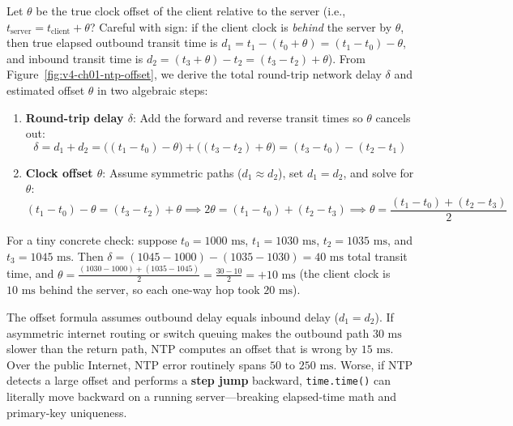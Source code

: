 Let $\theta$ be the true clock offset of the client relative to the server (i.e., $t_{\text{server}} = t_{\text{client}} + \theta$? Careful with sign: if the client clock is \emph{behind} the server by $\theta$, then true elapsed outbound transit time is $d_1 = t_1 - (t_0 + \theta) = (t_1 - t_0) - \theta$, and inbound transit time is $d_2 = (t_3 + \theta) - t_2 = (t_3 - t_2) + \theta$). From Figure~\ref{fig:v4-ch01-ntp-offset}, we derive the total round-trip network delay $\delta$ and estimated offset $\theta$ in two algebraic steps:
\begin{enumerate}[leftmargin=18pt]
  \item \textbf{Round-trip delay $\delta$}: Add the forward and reverse transit times so $\theta$ cancels out:
  \begin{equation}
  \delta = d_1 + d_2 = \bigl((t_1 - t_0) - \theta\bigr) + \bigl((t_3 - t_2) + \theta\bigr) = (t_3 - t_0) - (t_2 - t_1)
  \end{equation}
  \item \textbf{Clock offset $\theta$}: Assume symmetric paths ($d_1 \approx d_2$), set $d_1 = d_2$, and solve for $\theta$:
  \begin{equation}
  (t_1 - t_0) - \theta = (t_3 - t_2) + \theta \implies 2\theta = (t_1 - t_0) + (t_2 - t_3) \implies \theta = \frac{(t_1 - t_0) + (t_2 - t_3)}{2}
  \end{equation}
\end{enumerate}

For a tiny concrete check: suppose $t_0 = 1000\text{ ms}$, $t_1 = 1030\text{ ms}$, $t_2 = 1035\text{ ms}$, and $t_3 = 1045\text{ ms}$. Then $\delta = (1045 - 1000) - (1035 - 1030) = 40\text{ ms}$ total transit time, and $\theta = \frac{(1030 - 1000) + (1035 - 1045)}{2} = \frac{30 - 10}{2} = +10\text{ ms}$ (the client clock is $10\text{ ms}$ behind the server, so each one-way hop took $20\text{ ms}$).

\begin{productionwarningbox}
The offset formula assumes outbound delay equals inbound delay ($d_1 = d_2$). If asymmetric internet routing or switch queuing makes the outbound path $30\text{ ms}$ slower than the return path, NTP computes an offset that is wrong by $15\text{ ms}$. Over the public Internet, NTP error routinely spans $50\text{ to }250\text{ ms}$. Worse, if NTP detects a large offset and performs a \textbf{step jump} backward, \texttt{time.time()} can literally move backward on a running server---breaking elapsed-time math and primary-key uniqueness.
\end{productionwarningbox}


